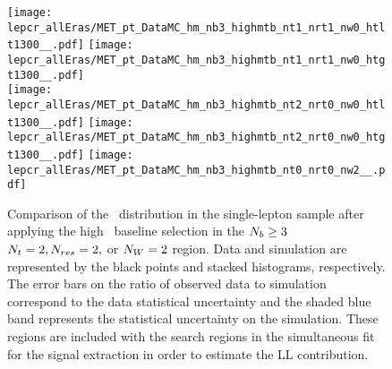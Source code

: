 \begin{figure}[!h]
	\begin{center}
  \texttt{[image: lepcr\_allEras/MET\_pt\_DataMC\_hm\_nb3\_highmtb\_nt1\_nrt1\_nw0\_htlt1300\_\_.pdf]} 
  \texttt{[image: lepcr\_allEras/MET\_pt\_DataMC\_hm\_nb3\_highmtb\_nt1\_nrt1\_nw0\_htgt1300\_\_.pdf]} \\
  \texttt{[image: lepcr\_allEras/MET\_pt\_DataMC\_hm\_nb3\_highmtb\_nt2\_nrt0\_nw0\_htlt1300\_\_.pdf]} 
  \texttt{[image: lepcr\_allEras/MET\_pt\_DataMC\_hm\_nb3\_highmtb\_nt2\_nrt0\_nw0\_htgt1300\_\_.pdf]} 
  \texttt{[image: lepcr\_allEras/MET\_pt\_DataMC\_hm\_nb3\_highmtb\_nt0\_nrt0\_nw2\_\_.pdf]} \\
	\end{center}
	\caption[Lost Lepton HM Control Region $\nb\geq3$ with 2 heavy objects]{Comparison of the \met~distribution in the single-lepton sample after applying the high \dm~baseline selection in the $\nb\geq3$ $N_{t}=2, N_{res}=2,$ or $N_{W}=2$ region. Data and simulation are represented by the black points and stacked histograms, respectively. The error bars on the ratio of observed data to simulation correspond to the data statistical uncertainty and the shaded blue band represents the statistical uncertainty on the simulation. These regions are included with the search regions in the simultaneous fit for the signal extraction in order to estimate the LL contribution.
	 }
	\label{fig:llb-1lcr-datavsmc-hm-nb3-2}
\end{figure}
